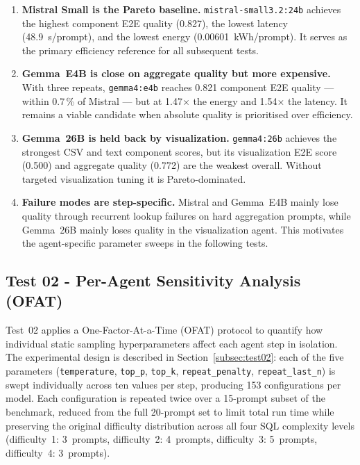 \begin{enumerate}
    \item \textbf{Mistral Small is the Pareto baseline.}
          \texttt{mistral-\allowbreak small3.2:24b} achieves the highest component E2E
          quality (0.827), the lowest latency (48.9~s/prompt), and the lowest
          energy (0.00601~kWh/prompt). It serves as the primary efficiency
          reference for all subsequent tests.

    \item \textbf{Gemma~E4B is close on aggregate quality but more expensive.}
          With three repeats, \texttt{gemma4:e4b} reaches 0.821 component E2E
          quality --- within 0.7\,\% of Mistral --- but at 1.47$\times$ the
          energy and 1.54$\times$ the latency. It remains a viable candidate
          when absolute quality is prioritised over efficiency.

    \item \textbf{Gemma~26B is held back by visualization.}
          \texttt{gemma4:26b} achieves the strongest CSV and text component
          scores, but its visualization E2E score (0.500) and aggregate
          quality (0.772) are the weakest overall. Without targeted
          visualization tuning it is Pareto-dominated.

    \item \textbf{Failure modes are step-specific.}
          Mistral and Gemma~E4B mainly lose quality through recurrent lookup
          failures on hard aggregation prompts, while Gemma~26B mainly loses
          quality in the visualization agent. This motivates the agent-specific
          parameter sweeps in the following tests.
\end{enumerate}

\subsection{Test 02 - Per-Agent Sensitivity Analysis (OFAT)}
\label{subsec:res02}

Test~02 applies a One-Factor-At-a-Time (OFAT) protocol to quantify how
individual static sampling hyperparameters affect each agent step in
isolation. The experimental design is described in
Section~\ref{subsec:test02}: each of the five parameters
(\texttt{temperature}, \texttt{top\_p}, \texttt{top\_k},
\texttt{repeat\_penalty}, \texttt{repeat\_last\_n}) is swept
individually across ten values per step, producing 153 configurations
per model. Each configuration is repeated twice over a 15-prompt subset
of the benchmark, reduced from the full 20-prompt set to limit total
run time while preserving the original difficulty distribution across
all four SQL complexity levels (difficulty~1: 3~prompts, difficulty~2:
4~prompts, difficulty~3: 5~prompts, difficulty~4: 3~prompts).

